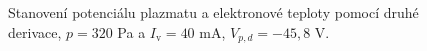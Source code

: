 \documentclass[a4paper,12pt]{article}
\begin{document}
\begin{figure}[h]
	\centering
	\begin{subfigure}[b]{.49\textwidth}
		\centering
	\end{subfigure}
	\begin{subfigure}[b]{.49\textwidth}
		\centering
	\end{subfigure}
	\caption{Stanovení potenciálu plazmatu a elektronové teploty pomocí druhé 
	derivace, $p = 320$ 
	\si{\pascal} a $I_\text{v} = 40$ \si{\milli\ampere}, $V_{p,d} = 
	-45,8$ V.}
	\label{data3sec}
\end{figure}
\end{document}
